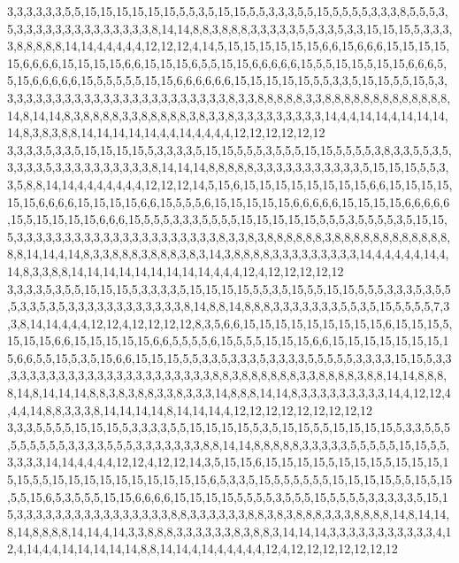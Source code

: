 3,3,3,3,3,3,5,5,15,15,15,15,15,15,5,5,3,5,15,15,5,5,3,3,3,5,5,15,5,5,5,5,3,3,3,8,5,5,5,3,5,3,3,3,3,3,3,3,3,3,3,3,3,3,3,8,14,14,8,8,3,8,8,8,3,3,3,3,3,5,5,3,3,5,3,3,15,15,15,5,3,3,3,3,8,8,8,8,8,14,14,4,4,4,4,4,12,12,12,4,14,5,15,15,15,15,15,15,6,6,15,6,6,6,15,15,15,15,15,6,6,6,6,15,15,15,15,6,6,15,15,15,6,5,5,15,15,6,6,6,6,6,15,5,5,15,15,5,15,15,6,6,6,5,5,15,6,6,6,6,6,15,5,5,5,5,5,15,15,6,6,6,6,6,6,15,15,15,15,15,5,5,3,3,5,15,15,5,5,15,5,3,3,3,3,3,3,3,3,3,3,3,3,3,3,3,3,3,3,3,3,3,3,3,3,8,3,3,8,8,8,8,8,3,3,8,8,8,8,8,8,8,8,8,8,8,8,8,14,8,14,14,8,3,8,8,8,8,3,3,8,8,8,8,8,3,8,3,3,8,3,3,3,3,3,3,3,3,3,14,4,4,14,14,4,14,14,14,14,8,3,8,3,8,8,14,14,14,14,14,4,4,14,4,4,4,4,12,12,12,12,12,12
3,3,3,3,5,3,3,5,15,15,15,15,5,3,3,3,3,5,15,15,5,5,5,3,5,5,5,15,15,5,5,5,5,3,8,3,3,5,5,3,5,3,3,3,3,5,3,3,3,3,3,3,3,3,3,3,8,14,14,14,8,8,8,8,8,3,3,3,3,3,3,3,3,3,3,3,5,15,15,15,5,5,3,3,5,8,8,14,14,4,4,4,4,4,4,4,12,12,12,14,5,15,6,15,15,15,15,15,15,15,15,6,6,15,15,15,15,15,15,6,6,6,6,15,15,15,15,6,6,15,5,5,5,6,15,15,15,15,15,6,6,6,6,6,15,15,15,15,6,6,6,6,6,15,5,15,15,15,15,6,6,6,15,5,5,5,3,3,3,5,5,5,5,15,15,15,15,15,5,5,5,3,5,5,5,5,3,5,15,15,5,3,3,3,3,3,3,3,3,3,3,3,3,3,3,3,3,3,3,3,3,3,8,3,3,8,3,8,8,8,8,8,8,3,8,8,8,8,8,8,8,8,8,8,8,8,8,8,14,14,4,14,8,3,3,8,8,8,3,8,8,8,3,8,3,14,3,8,8,8,8,3,3,3,3,3,3,3,3,3,14,4,4,4,4,4,14,4,14,8,3,3,8,8,14,14,14,14,14,14,14,14,14,4,4,4,12,4,12,12,12,12,12
3,3,3,3,5,3,5,5,15,15,15,5,3,3,3,3,5,15,15,15,15,5,5,3,5,15,5,5,15,15,5,5,5,3,3,3,5,3,5,5,5,3,3,5,3,5,3,3,3,3,3,3,3,3,3,3,3,3,8,14,8,8,14,8,8,8,3,3,3,3,3,3,3,5,5,3,5,15,5,5,5,5,7,3,3,8,14,14,4,4,4,12,12,4,12,12,12,12,8,3,5,6,6,15,15,15,15,15,15,15,15,15,6,15,15,15,5,15,15,15,6,6,15,15,15,15,15,6,6,5,5,5,5,6,15,5,5,5,15,15,15,6,6,15,15,15,15,15,15,15,15,6,6,5,5,15,5,3,5,15,6,6,15,15,15,5,5,3,3,5,3,3,3,5,3,3,3,3,5,5,5,5,5,3,3,3,3,15,15,5,3,3,3,3,3,3,3,3,3,3,3,3,3,3,3,3,3,3,3,3,3,3,3,8,8,3,8,8,8,8,8,8,3,3,8,8,8,8,3,8,8,14,14,8,8,8,8,14,8,14,14,14,8,8,3,8,3,8,8,3,3,8,3,3,3,14,8,8,8,14,14,8,3,3,3,3,3,3,3,3,3,14,4,12,12,4,4,4,14,8,8,3,3,3,8,14,14,14,14,8,14,14,14,4,12,12,12,12,12,12,12,12,12
3,3,3,5,5,5,5,15,15,15,5,3,3,3,3,5,5,15,15,15,15,5,3,5,15,15,5,5,15,15,15,15,5,3,3,5,5,5,5,5,5,5,5,5,3,3,3,3,5,5,5,3,3,3,3,3,3,3,8,8,14,14,8,8,8,8,8,3,3,3,3,3,5,5,5,5,5,15,15,5,5,3,3,3,3,14,14,4,4,4,4,12,12,4,12,12,14,3,5,15,15,6,15,15,15,15,5,15,15,15,5,15,15,15,15,15,5,5,15,15,15,15,15,15,15,15,15,15,6,5,3,3,5,15,5,5,5,5,5,5,15,15,15,15,5,5,15,5,15,5,5,15,6,5,3,5,5,5,15,15,6,6,6,6,15,15,15,15,5,5,5,5,3,5,5,5,15,5,5,5,5,3,3,3,3,3,5,15,15,3,3,3,3,3,3,3,3,3,3,3,3,3,3,3,3,8,8,3,3,3,3,3,3,8,8,3,8,3,8,8,8,3,3,3,8,8,8,8,14,8,14,14,8,14,8,8,8,8,14,14,4,14,3,3,8,8,8,3,3,3,3,3,3,8,3,8,8,3,14,14,14,3,3,3,3,3,3,3,3,3,3,3,4,12,4,14,4,4,14,14,14,14,14,8,8,14,14,4,14,4,4,4,4,4,12,4,12,12,12,12,12,12,12

